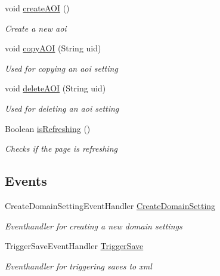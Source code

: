 \begin{DoxyCompactItemize}
void \hyperlink{class_web_analyzer_1_1_u_i_1_1_interaction_objects_1_1_domain_setting_control_a26803d2f4b4e6d9b3b9746d245d45190}{create\+A\+O\+I} ()
\begin{DoxyCompactList}\small\item\em Create a new aoi \end{DoxyCompactList}\item 
void \hyperlink{class_web_analyzer_1_1_u_i_1_1_interaction_objects_1_1_domain_setting_control_ade3c26de20eec061fccdbad1e33966e1}{copy\+A\+O\+I} (String uid)
\begin{DoxyCompactList}\small\item\em Used for copying an aoi setting \end{DoxyCompactList}\item 
void \hyperlink{class_web_analyzer_1_1_u_i_1_1_interaction_objects_1_1_domain_setting_control_a9eb07ab9de98ec5b9f4d2ef662fa2970}{delete\+A\+O\+I} (String uid)
\begin{DoxyCompactList}\small\item\em Used for deleting an aoi setting \end{DoxyCompactList}\item 
Boolean \hyperlink{class_web_analyzer_1_1_u_i_1_1_interaction_objects_1_1_domain_setting_control_ab7498deab19b4b9ce1a05a98f670c801}{is\+Refreshing} ()
\begin{DoxyCompactList}\small\item\em Checks if the page is refreshing \end{DoxyCompactList}\end{DoxyCompactItemize}
\subsection*{Events}
\begin{DoxyCompactItemize}
\item 
Create\+Domain\+Setting\+Event\+Handler \hyperlink{class_web_analyzer_1_1_u_i_1_1_interaction_objects_1_1_domain_setting_control_aff18f63d7e7cb4b8c5d62b881bfc685c}{Create\+Domain\+Setting}
\begin{DoxyCompactList}\small\item\em Eventhandler for creating a new domain settings \end{DoxyCompactList}\item 
Trigger\+Save\+Event\+Handler \hyperlink{class_web_analyzer_1_1_u_i_1_1_interaction_objects_1_1_domain_setting_control_a1daa9c774e823427b39110bc42ff0ccd}{Trigger\+Save}
\begin{DoxyCompactList}\small\item\em Eventhandler for triggering saves to xml \end{DoxyCompactList}\end{DoxyCompactItemize}
